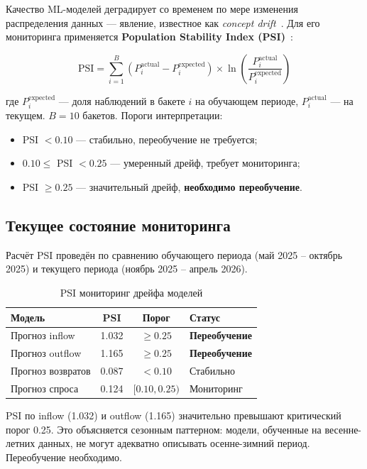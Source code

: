 Качество ML-моделей деградирует со временем по мере изменения распределения данных --- явление, известное как \textit{concept drift}~\cite{widmer1996learning}. Для его мониторинга применяется \textbf{Population Stability Index (PSI)}~\cite{siddiqi2006credit}:

\begin{equation}
\text{PSI} = \sum_{i=1}^{B} \left( P_i^{\text{actual}} - P_i^{\text{expected}} \right) \times \ln\!\left( \frac{P_i^{\text{actual}}}{P_i^{\text{expected}}} \right)
\end{equation}

где $P_i^{\text{expected}}$ --- доля наблюдений в бакете $i$ на обучающем периоде, $P_i^{\text{actual}}$ --- на текущем. $B = 10$ бакетов. Пороги интерпретации:
\begin{itemize}
  \item PSI $< 0.10$ --- стабильно, переобучение не требуется;
  \item $0.10 \le$ PSI $< 0.25$ --- умеренный дрейф, требует мониторинга;
  \item PSI $\ge 0.25$ --- значительный дрейф, \textbf{необходимо переобучение}.
\end{itemize}

\subsection{Текущее состояние мониторинга}

Расчёт PSI проведён по сравнению обучающего периода (май 2025 -- октябрь 2025) и текущего периода (ноябрь 2025 -- апрель 2026).

\begin{table}[H]
\centering
\caption{PSI мониторинг дрейфа моделей}
\label{tab:psi_monitoring}
\begin{tabular}{lccl}
\toprule
\textbf{Модель} & \textbf{PSI} & \textbf{Порог} & \textbf{Статус} \\
\midrule
Прогноз inflow & 1.032 & $\ge 0.25$ & \textbf{Переобучение} \\
Прогноз outflow & 1.165 & $\ge 0.25$ & \textbf{Переобучение} \\
Прогноз возвратов & 0.087 & $< 0.10$ & Стабильно \\
Прогноз спроса & 0.124 & $[0.10,0.25)$ & Мониторинг \\
\bottomrule
\end{tabular}
\end{table}

PSI по inflow (1.032) и outflow (1.165) значительно превышают критический порог 0.25. Это объясняется сезонным паттерном: модели, обученные на весенне-летних данных, не могут адекватно описывать осенне-зимний период. Переобучение необходимо.

